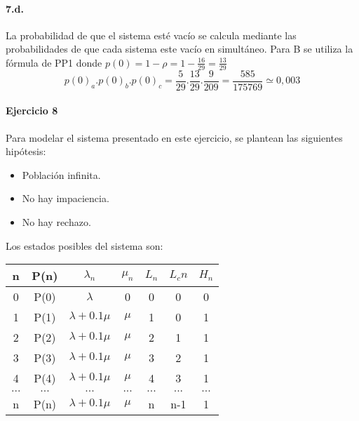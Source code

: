 \documentclass{article}
\begin{document}
  \paragraph{7.d.} La probabilidad de que el sistema esté vacío se calcula mediante las probabilidades de que cada sistema este vacío en simultáneo. 
  Para B se utiliza la fórmula de PP1 donde $p(0) = 1-\rho = 1- \frac{16}{29} = \frac{13}{29} $
  $$ p(0)_a . p(0)_b . p(0)_c = \frac{5}{29} .\frac{13}{29} . \frac{9}{209} = \frac{585}{175769} \simeq 0,003 $$

\paragraph{Ejercicio 8}
   Para modelar el sistema presentado en este ejercicio, se plantean las siguientes hipótesis:

   \begin{itemize}
      \item Población infinita.
      \item No hay impaciencia.
      \item No hay rechazo.
   \end{itemize}

   Los estados posibles del sistema son:
   \begin{center}
   \begin{tabular}{|| c | c | c | c | c | c | c ||}
   \hline 
      n     & P(n) & $\lambda_n$         & $\mu_n$ & $L_n$& $L_cn$ & $H_n$ \\ \hline \hline
      0     & P(0) & $\lambda$           & 0       & 0    & 0      & 0     \\ \hline
      1     & P(1) & $\lambda + 0.1 \mu$ & $\mu$   & 1    & 0      & 1     \\ \hline
      2     & P(2) & $\lambda + 0.1 \mu$ & $\mu$   & 2    & 1      & 1     \\ \hline
      3     & P(3) & $\lambda + 0.1 \mu$ & $\mu$   & 3    & 2      & 1     \\ \hline
      4     & P(4) & $\lambda + 0.1 \mu$ & $\mu$   & 4    & 3      & 1     \\ \hline
      $...$ & $...$& $...$               & $...$   & $...$& $...$  & $...$ \\ \hline
      n     & P(n) & $\lambda + 0.1 \mu$ & $\mu$   & n    & n-1    & 1     \\ \hline
   \end{tabular}
   \end{center}
\end{document}
